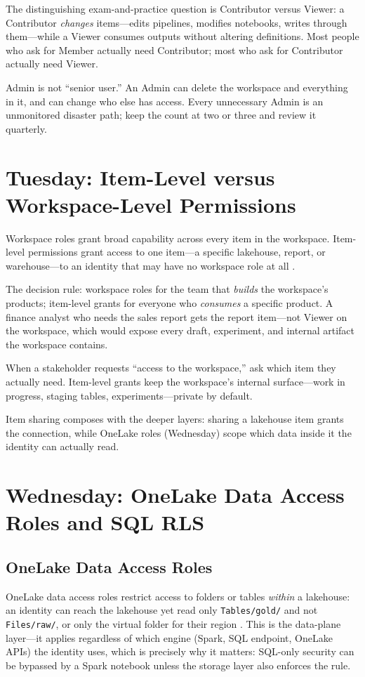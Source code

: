 The distinguishing exam-and-practice question is Contributor versus Viewer: a Contributor \emph{changes} items---edits pipelines, modifies notebooks, writes through them---while a Viewer consumes outputs without altering definitions. Most people who ask for Member actually need Contributor; most who ask for Contributor actually need Viewer.

\begin{pitfall}
Admin is not ``senior user.'' An Admin can delete the workspace and everything in it, and can change who else has access. Every unnecessary Admin is an unmonitored disaster path; keep the count at two or three and review it quarterly.
\end{pitfall}

\section{Tuesday: Item-Level versus Workspace-Level Permissions}
Workspace roles grant broad capability across every item in the workspace. Item-level permissions grant access to one item---a specific lakehouse, report, or warehouse---to an identity that may have no workspace role at all \cite{microsoftFabricSecurity}.

The decision rule: workspace roles for the team that \emph{builds} the workspace's products; item-level grants for everyone who \emph{consumes} a specific product. A finance analyst who needs the sales report gets the report item---not Viewer on the workspace, which would expose every draft, experiment, and internal artifact the workspace contains.

\begin{tipbox}
When a stakeholder requests ``access to the workspace,'' ask which item they actually need. Item-level grants keep the workspace's internal surface---work in progress, staging tables, experiments---private by default.
\end{tipbox}

Item sharing composes with the deeper layers: sharing a lakehouse item grants the connection, while OneLake roles (Wednesday) scope which data inside it the identity can actually read.

\section{Wednesday: OneLake Data Access Roles and SQL RLS}
\subsection{OneLake Data Access Roles}
OneLake data access roles restrict access to folders or tables \emph{within} a lakehouse: an identity can reach the lakehouse yet read only \texttt{Tables/gold/} and not \texttt{Files/raw/}, or only the virtual folder for their region \cite{microsoftFabricSecurity}. This is the data-plane layer---it applies regardless of which engine (Spark, SQL endpoint, OneLake APIs) the identity uses, which is precisely why it matters: SQL-only security can be bypassed by a Spark notebook unless the storage layer also enforces the rule.

